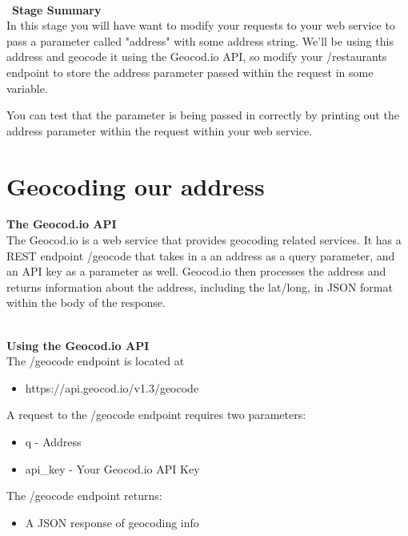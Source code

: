 \documentclass{article}
\begin{document}
\-\\\ 
\textbf{Stage Summary}\\
In this stage you will have want to modify your requests to your web service to pass a parameter called "address" with some address string. We'll be using this address and geocode it using the Geocod.io API, so modify your /restaurants endpoint to store the address parameter passed within the request in some variable. 

\begin{info}[Hint:]
You can test that the parameter is being passed in correctly by printing out the address parameter within the request within your web service. 
\end{info}


\section{Geocoding our address}

\textbf{The Geocod.io API}\\
The Geocod.io is a web service that provides geocoding related services. It has a REST endpoint /geocode that takes in a an address as a query parameter, and an API key as a parameter as well. Geocod.io then processes the address and returns information about the address, including the lat/long, in JSON format within the body of the response. 

\-\ \\
\textbf{Using the Geocod.io API}\\
The /geocode endpoint is located at
\begin{itemize}
\item https://api.geocod.io/v1.3/geocode
\end{itemize}
A request to the /geocode endpoint requires two parameters:
\begin{itemize}
\item q - Address
\item api\_key - Your Geocod.io API Key
\end{itemize}
The /geocode endpoint returns:
\begin{itemize}
\item A JSON response of geocoding info
\end{itemize}
\end{document}
